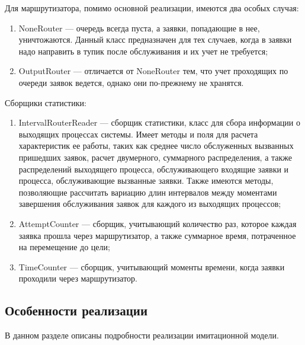 Для маршрутизатора, помимо основной реализации, имеются два особых случая:
\begin{enumerate}
	\item NoneRouter --- очередь всегда пуста, а заявки, попадающие в нее, уничтожаются. Данный класс предназначен для тех случаев, когда в заявки надо направить в тупик после обслуживания и их учет не требуется;
	\item OutputRouter --- отличается от NoneRouter тем, что учет проходящих по очереди заявок ведется, однако они по-прежнему не хранятся.
\end{enumerate}

Сборщики статистики:
\begin{enumerate}
	\item IntervalRouterReader --- сборщик статистики, класс для сбора информации о выходящих процессах системы. Имеет методы и поля для расчета характеристик ее работы, таких как среднее число обслуженных вызванных пришедших заявок, расчет двумерного, суммарного распределения, а также распределений выходящего процесса, обслуживающего входящие заявки и процесса, обслуживающие вызванные заявки. Также имеются методы, позволяющие рассчитать вариацию длин интервалов между моментами завершения обслуживания заявок для каждого из выходящих процессов;
	\item AttemptCounter --- сборщик, учитывающий количество раз, которое каждая заявка прошла через маршрутизатор, а также суммарное время, потраченное на перемещение до цели;
	\item TimeCounter --- сборщик, учитывающий моменты времени, когда заявки проходили через маршрутизатор.
\end{enumerate}

\subsection{Особенности реализации}
В данном разделе описаны подробности реализации имитационной модели.

